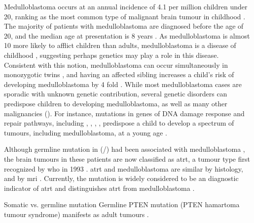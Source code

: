 Medulloblastoma occurs at an annual incidence of 4.1 per million children under 20, ranking as the most common type of malignant brain tumour in childhood . The majority of patients with medulloblastoma are diagnosed before the age of 20, and the median age at presentation is 8 years . As medulloblastoma is almost 10 more likely to afflict children than adults, medulloblastoma is a disease of childhood , suggesting perhaps genetics may play a role in this disease. Consistent with this notion, medulloblastoma can occur simultaneously in monozygotic twins , and having an affected sibling increases a child's risk of developing medulloblastoma by 4 fold . While most medulloblastoma cases are sporadic with unknown genetic contribution, several genetic disorders can predispose children to developing medulloblastoma, as well as many other malignancies (). For instance, mutations in genes of DNA damage response and repair pathways, including , , , , predispose a child to develop a spectrum of tumours, including medulloblastoma, at a young age . 

Although germline mutation in  (/) had been associated with medulloblastoma , the brain tumours in these patients are now classified as \gls{atrt}, a tumour type first recognized by \gls{who} in 1993  . \gls{atrt} and medulloblastoma are similar by histology, and by \gls{mri} . Currently, the  mutation is widely considered to be an diagnostic indicator of \gls{atrt} and distinguishes \gls{atrt} from medulloblastoma .

Somatic vs. germline mutation
Germline PTEN mutation (PTEN hamartoma tumour syndrome) manifests as adult tumours .

